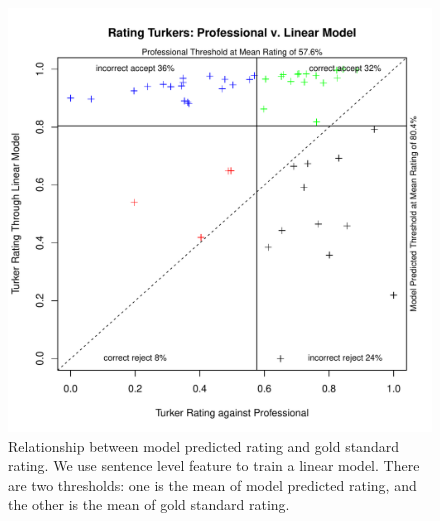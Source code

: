 \documentclass[11pt]{article}
\begin{document}
\begin{figure}[htbp]
  \centering
  \includegraphics[width=\linewidth]{Senfeature/rrankingsenfeatureranking2}
  \caption{Relationship between model predicted rating and gold standard rating. We use sentence level feature to train a linear model. There are two thresholds: one is the mean of model predicted rating, and the other is the mean of gold standard rating.}
    \label{flmsenrrating2}
\end{figure}
\end{document}
